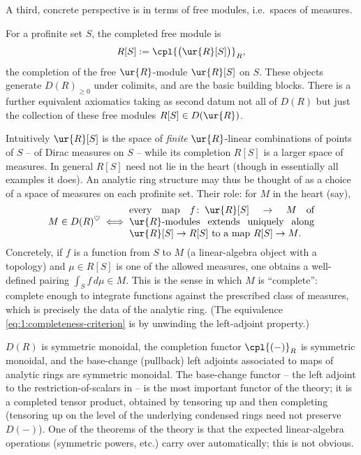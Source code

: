 A third, concrete perspective is in terms of free modules, i.e.\ spaces of
measures.

\begin{definition}
\label{def:1:free-modules}
For a profinite set $S$, the completed free module is
\begin{equation*}
R[S]:=\cpl{\bigl(\ur{R}[S]\bigr)}_R,
\end{equation*}
the completion of the free $\ur{R}$-module $\ur{R}[S]$ on $S$. These objects
generate $D(R)_{\geq 0}$ under colimits, and are the basic building blocks. There
is a further equivalent axiomatics taking as second datum not all of $D(R)$ but
just the collection of these free modules $R[S]\in D(\ur{R})$.
\end{definition}

\begin{remark}
\label{rmk:1:measures}
Intuitively $\ur{R}[S]$ is the space of \emph{finite} $\ur{R}$-linear
combinations of points of $S$ -- of Dirac measures on $S$ -- while its
completion $R[S]$ is a larger space of measures. In general $R[S]$ need not lie
in the heart (though in essentially all examples it does). An analytic ring
structure may thus be thought of as a choice of a space of measures on each
profinite set. Their role: for $M$ in the heart (say),
\begin{equation}
\label{eq:1:completeness-criterion}
M\in D(R)^{\heartsuit}\iff
\parbox{0.55\textwidth}{every map $f\colon\ur{R}[S]\to M$ of $\ur{R}$-modules
extends uniquely along $\ur{R}[S]\to R[S]$ to a map $R[S]\to M$.}
\end{equation}
Concretely, if $f$ is a function from $S$ to $M$ (a linear-algebra object with a
topology) and $\mu\in R[S]$ is one of the allowed measures, one obtains a
well-defined pairing $\int_S f\,d\mu\in M$. This is the sense in which $M$ is
``complete'': complete enough to integrate functions against the prescribed
class of measures, which is precisely the data of the analytic ring. (The
equivalence \eqref{eq:1:completeness-criterion} is by unwinding the left-adjoint
property.)
\end{remark}

\begin{remark}
\label{rmk:1:monoidal}
$D(R)$ is symmetric monoidal, the completion functor $\cpl{(-)}_R$ is symmetric
monoidal, and the base-change (pullback) left adjoints associated to maps of
analytic rings are symmetric monoidal. The base-change functor -- the left
adjoint to the restriction-of-scalars in  -- is
the most important functor of the theory; it is a completed tensor product,
obtained by tensoring up and then completing (tensoring up on the level of the
underlying condensed rings need not preserve $D(-)$). One of the theorems of the
theory is that the expected linear-algebra operations (symmetric powers, etc.)
carry over automatically; this is not obvious.
\end{remark}

